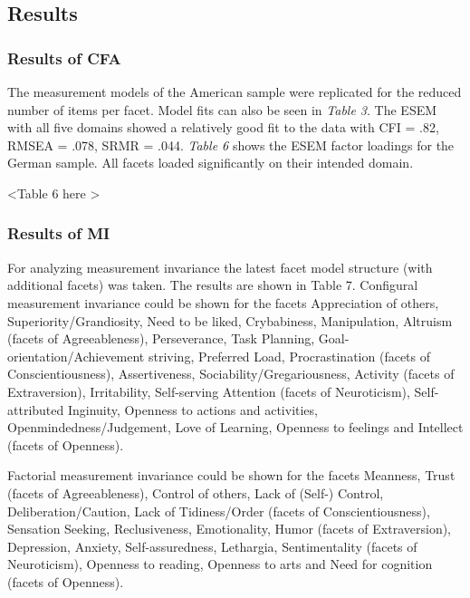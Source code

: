 \documentclass[,man,floatsintext]{apa6}
\theoremstyle{definition}
\theoremstyle{definition}
\theoremstyle{definition}
\theoremstyle{remark}
\begin{document}
\hypertarget{results-1}{%
\subsection{Results}\label{results-1}}

\hypertarget{results-of-cfa}{%
\subsubsection{Results of CFA}\label{results-of-cfa}}

The measurement models of the American sample were replicated for the
reduced number of items per facet. Model fits can also be seen in
\emph{Table 3}. The ESEM with all five domains showed a relatively good
fit to the data with CFI = .82, RMSEA = .078, SRMR = .044. \emph{Table
6} shows the ESEM factor loadings for the German sample. All facets
loaded significantly on their intended domain.

\vspace{5mm}

\textless{}Table 6 here \textgreater{}

\vspace{5mm}

\hypertarget{results-of-mi}{%
\subsubsection{Results of MI}\label{results-of-mi}}

For analyzing measurement invariance the latest facet model structure
(with additional facets) was taken. The results are shown in Table 7.
Configural measurement invariance could be shown for the facets
Appreciation of others, Superiority/Grandiosity, Need to be liked,
Crybabiness, Manipulation, Altruism (facets of Agreeableness),
Perseverance, Task Planning, Goal-orientation/Achievement striving,
Preferred Load, Procrastination (facets of Conscientiousness),
Assertiveness, Sociability/Gregariousness, Activity (facets of
Extraversion), Irritability, Self-serving Attention (facets of
Neuroticism), Self-attributed Inginuity, Openness to actions and
activities, Openmindedness/Judgement, Love of Learning, Openness to
feelings and Intellect (facets of Openness).

Factorial measurement invariance could be shown for the facets Meanness,
Trust (facets of Agreeableness), Control of others, Lack of (Self-)
Control, Deliberation/Caution, Lack of Tidiness/Order (facets of
Conscientiousness), Sensation Seeking, Reclusiveness, Emotionality,
Humor (facets of Extraversion), Depression, Anxiety, Self-assuredness,
Lethargia, Sentimentality (facets of Neuroticism), Openness to reading,
Openness to arts and Need for cognition (facets of Openness).
\end{document}
